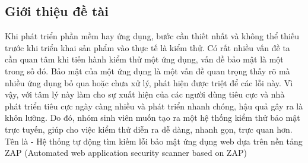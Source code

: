 \subsection*{Giới thiệu đề tài}
\tab Khi phát triển phần mềm hay ứng dụng, bước cần thiết nhất và không thể thiếu
trước khi triển khai sản phẩm vào thực tế là kiểm thử. Có rất nhiều vấn đề ta cần
quan tâm khi tiến hành kiểm thử một ứng dụng, vấn đề bảo mật là một trong số đó. Bảo mật
của một ứng dụng là một vấn đề quan trọng thấy rõ mà nhiều ứng dụng bỏ qua hoặc chưa xử lý, phát hiện
được triệt để các lỗi này. Vì vậy, với tâm lý này làm cho sự xuất hiện của các người dùng tiêu cực và
nhà phát triển tiêu cực ngày càng nhiều và phát triển nhanh chóng, hậu quả gây ra là khôn lường.
Do đó, nhóm sinh viên muốn tạo ra một hệ thống kiểm thử bảo mật trực tuyến, giúp cho việc kiểm thử diễn ra dễ dàng,
nhanh gọn, trực quan hơn. Tên là \applicationname - Hệ thống tự động tìm kiếm lỗi bảo mật ứng dụng web dựa trên nền tảng ZAP (Automated web application security scanner based on ZAP)